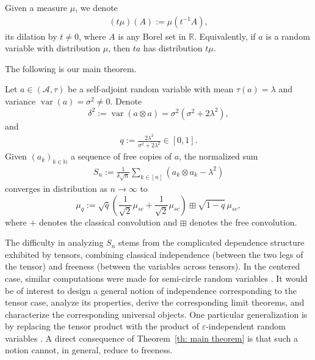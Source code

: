 \documentclass[12pt,reqno]{amsart}
\theoremstyle{plain}
\newcommand{\1}{\mathbf{1}}
\newcommand{\var}{\operatorname{var}}
\newcommand{\R}{\mathbb{R}}
\newcommand{\N}{\mathbb{N}}
\newcommand{\A}{\mathcal{A}}
\begin{document}
Given a measure $\mu$, we denote
\begin{align*}
    (t\mu)(A):=\mu(t^{-1}A),
\end{align*}
its dilation by $t \ne 0$, where $A$ is any Borel set in $\R$. Equivalently, if $a$ is a random variable with distribution $\mu$, then $ta$ has distribution $t\mu$.

The following is our main theorem.
\begin{theorem}\label{th: main theorem}
    Let $a \in (\A,\tau)$ be a self-adjoint random variable with mean $\tau(a)=\lambda$ and variance $\var(a)=\sigma^2\ne 0$. Denote  
    $$
    \delta^2:=\var(a\otimes a)= \sigma^2(\sigma^2+2\lambda^2),
    $$
    and
    \begin{align*}
    q:=\frac{2\lambda^2}{\sigma^2+2\lambda^2} \in [0,1].
\end{align*}
Given $(a_k)_{k\in \N}$ a sequence of free copies of $a$, the normalized sum 
    \begin{align*}
        S_n:= \frac{1}{\delta \sqrt{n}}\sum_{k \in [n]}(a_k\otimes a_k-\lambda^2)
    \end{align*}
    converges in distribution as $n\to \infty$ to 
    \begin{equation}\label{eq: limit measure}
        \mu_q:=\sqrt{q}\left(\frac{1}{\sqrt{2}}\mu_{sc}+\frac{1}{\sqrt{2}}\mu_{sc}\right)\boxplus\sqrt{1-q}\,\mu_{sc},
    \end{equation}
    where $+$ denotes the classical convolution and $\boxplus$ denotes the free convolution.
\end{theorem}

The difficulty in analyzing $S_n$ stems from the complicated dependence structure exhibited by tensors, combining classical independence (between the two legs of the tensor) and freeness (between the variables across tensors). In the centered case, similar computations were made for semi-circle random variables \cite{nica2016meandric,dehornoy2014dual}.
It would be of interest to design a general notion of independence corresponding to the tensor case, analyze its properties, derive the corresponding limit theorems, and characterize the corresponding universal objects. One particular generalization is by replacing the tensor product with the product of $\varepsilon$-independent random variables \cite{speicher2016mixtures,mlotkowski2004lambdafree,speicher2019quantum}. A direct consequence of Theorem~\ref{th: main theorem} is that such a notion cannot, in general, reduce to freeness. 
\end{document}
